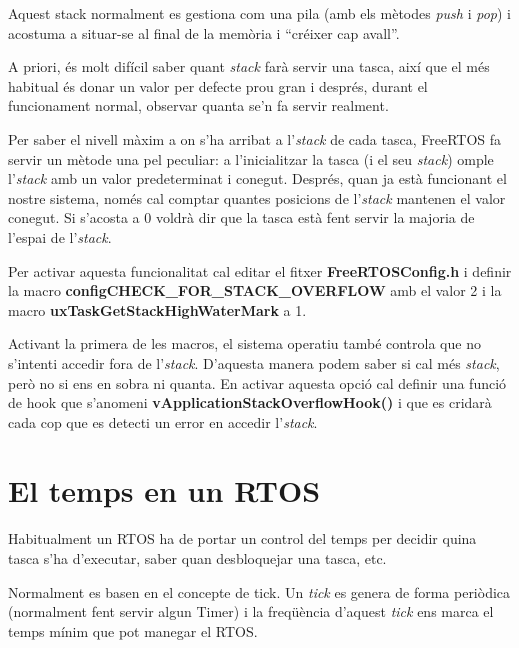 Aquest \gls{stack} normalment es gestiona com una pila (amb els mètodes {\em push} i {\em pop}) i acostuma a situar-se al final de la memòria i “créixer cap avall”.

A priori, és molt difícil saber quant {\em stack} farà servir una tasca, així que el més habitual és donar un valor per defecte prou gran i després, durant el funcionament normal, observar quanta se'n fa servir realment.

Per saber el nivell màxim a on s'ha arribat a l'{\em stack} de cada tasca, FreeRTOS fa servir un mètode una pel peculiar: a l'inicialitzar la tasca (i el seu {\em stack}) omple l'{\em stack} amb un valor predeterminat i conegut. Després, quan ja està funcionant el nostre sistema, només cal comptar quantes posicions de l'{\em stack} mantenen el valor conegut. Si s'acosta a 0 voldrà dir que la tasca està fent servir la majoria de l'espai de l'{\em stack}.

Per activar aquesta funcionalitat cal editar el fitxer {\bf FreeRTOSConfig.h} i definir la macro {\bf configCHECK\_FOR\_STACK\_OVERFLOW} amb el valor 2 i la macro {\bf uxTaskGetStackHighWaterMark} a 1.

Activant la primera de les macros, el sistema operatiu també controla que no s'intenti accedir fora de l'{\em stack}. D'aquesta manera podem saber si cal més {\em stack}, però no si ens en sobra ni quanta. En activar aquesta opció cal definir una funció de hook que s'anomeni {\bf vApplicationStackOverflowHook()} i que es cridarà cada cop que es detecti un error en accedir l'{\em stack}.




\section{El temps en un RTOS}
\label{sec:RTOS_time}
Habitualment un RTOS ha de portar un control del temps per decidir quina tasca s'ha d'executar, saber quan desbloquejar una tasca, etc.

Normalment es basen en el concepte de \gls{tick}. Un {\em tick} es genera de forma periòdica (normalment fent servir algun Timer) i la freqüència d'aquest {\em tick} ens marca el temps mínim que pot manegar el RTOS.

